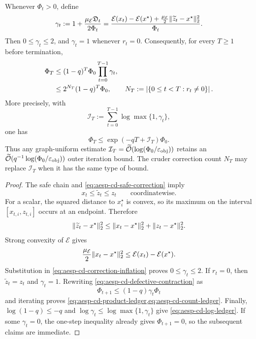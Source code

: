 \begin{lemma}
\label{lem:aesp-cd-multiplicative-ledger}
Whenever $\Phi_t>0$, define
\begin{equation}
 \gamma_t
 :=1+\frac{\mu_{\mathcal E}\mathfrak D_t}{2\Phi_t}
 =\frac{
   \mathcal E(x_t)-\mathcal E(x^\star)
   +\frac{\mu_{\mathcal E}}2
      \lVert\widetilde z_t-x^\star\rVert_2^2}
  {\Phi_t}.
 \label{eq:aesp-cd-correction-inflation}
\end{equation}
Then $0\leq\gamma_t\leq2$, and $\gamma_t=1$ whenever $r_t=0$.
Consequently, for every $T\geq1$ before termination,
\begin{align}
 \Phi_T
 &\leq(1-q)^T\Phi_0\prod_{t=0}^{T-1}\gamma_t,
 \label{eq:aesp-cd-product-ledger}\\
 &\leq2^{N_T}(1-q)^T\Phi_0,
 \qquad
 N_T:=\left\lvert \{0\leq t<T:r_t\neq0\} \right\rvert.
 \label{eq:aesp-cd-count-ledger}
\end{align}
More precisely, with
\begin{equation}
 \mathcal I_T:=\sum_{t=0}^{T-1}\log\max\{1,\gamma_t\},
 \label{eq:aesp-cd-log-inflation}
\end{equation}
one has
\begin{equation}
 \Phi_T\leq\exp(-qT+\mathcal I_T)\Phi_0.
 \label{eq:aesp-cd-log-ledger}
\end{equation}
Thus any graph-uniform estimate
$\mathcal I_T=\widetilde{\mathcal{O}}(\log(\Phi_0/\varepsilon_{\mathrm{obj}}))$ retains an
$\widetilde{\mathcal{O}}(q^{-1}\log(\Phi_0/\varepsilon_{\mathrm{obj}}))$ outer iteration bound.  The cruder
correction count $N_T$ may replace $\mathcal I_T$ when it has the same type of
bound.
\end{lemma}

\begin{proof}
The safe chain and \cref{eq:aesp-cd-safe-correction} imply
\begin{equation*}
 x_t\leq\widetilde z_t\leq z_t
 \qquad\text{coordinatewise}.
\end{equation*}
For a scalar, the squared distance to $x_i^\star$ is convex, so its maximum
on the interval $[x_{t,i},z_{t,i}]$ occurs at an endpoint.  Therefore
\begin{equation*}
 \lVert\widetilde z_t-x^\star\rVert_2^2
 \leq\lVert x_t-x^\star\rVert_2^2
     +\lVert z_t-x^\star\rVert_2^2.
\end{equation*}
Strong convexity of $\mathcal E$ gives
\begin{equation*}
 \frac{\mu_{\mathcal E}}2
 \lVert x_t-x^\star\rVert_2^2
 \leq\mathcal E(x_t)-\mathcal E(x^\star).
\end{equation*}
Substitution in \cref{eq:aesp-cd-correction-inflation} proves
$0\leq\gamma_t\leq2$.  If $r_t=0$, then
$\widetilde z_t=z_t$ and $\gamma_t=1$.  Rewriting
\cref{eq:aesp-cd-defective-contraction} as
\begin{equation*}
 \Phi_{t+1}\leq(1-q)\gamma_t\Phi_t
\end{equation*}
and iterating proves
\cref{eq:aesp-cd-product-ledger,eq:aesp-cd-count-ledger}.  Finally,
$\log(1-q)\leq-q$ and
$\log\gamma_t\leq\log\max\{1,\gamma_t\}$ give
\cref{eq:aesp-cd-log-ledger}.  If some $\gamma_t=0$, the one-step inequality
already gives $\Phi_{t+1}=0$, so the subsequent claims are immediate.
\end{proof}

